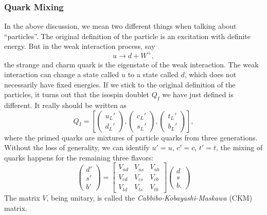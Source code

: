 \documentclass[aps,rmp,twocolumn,superscriptaddress,nofootinbib]{revtex4-2}
\begin{document}
\subsubsection{Quark Mixing}
In the above discussion, we mean two different things when talking about ``particles''. 
The original definition of the particle is an excitation with definite energy.
But in the weak interaction process, say
\begin{equation}
	u \rightarrow d + W^+,
\end{equation}
the strange and charm quark is the eigenstate of the weak interaction.
The weak interaction can change a state called $u$ to a state called $d$, which does not necessarily have fixed energies.
If we stick to the original definition of the particles, it turns out that the isospin doublet $Q_I$ we have just defined is different.
It really should be written as
\begin{equation}
	Q_I = \left[
		\begin{pmatrix} u_L' \\ d_L' \end{pmatrix},
		\begin{pmatrix} c_L' \\ s_L' \end{pmatrix},
		\begin{pmatrix} t_L' \\ b_L' \end{pmatrix}
	\right],
\end{equation}
where the primed quarks are mixtures of particle quarks from three generations.
Without the loss of generality, we can identify $u'=u$, $c'=c$, $t'=t$, the mixing of quarks happens for the remaining three flavors:
\begin{equation}
	\begin{pmatrix}
		d' \\ s' \\ b'
	\end{pmatrix}
	= \begin{bmatrix}
		V_{ud} & V_{us} & V_{ub} \\
		V_{cd} & V_{cs} & V_{cb} \\
		V_{td} & V_{ts} & V_{tb}
	\end{bmatrix}
	\begin{pmatrix}
		d \\ s \\ b.
	\end{pmatrix}
\end{equation}
The matrix $V$, being unitary, is called the \textit{Cabbibo-Kobayashi-Maskawa} (CKM) matrix.
\end{document}
